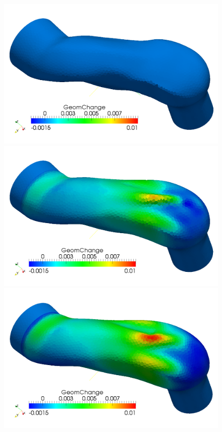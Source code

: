 \documentclass[8pt]{beamer}
\begin{document}
{\begin{figure}[htbp]
\begin{minipage}[b]{3.5 cm}
  \end{minipage}\\
  \begin{minipage}[b]{3.5 cm}
    \includegraphics[scale=0.08]{RLRioJ12_v2_GC_0.png}
  \end{minipage}
    \begin{minipage}[b]{3.5 cm}
    \includegraphics[scale=0.08]{RLRioJ12_v2_GC_20.png}
  \end{minipage}
  \begin{minipage}[b]{3.5 cm}
    \includegraphics[scale=0.08]{RLRioJ12_v2_GC_80.png}
  \end{minipage}
  \label{SGio1}
\end{figure}
}
\end{document}
